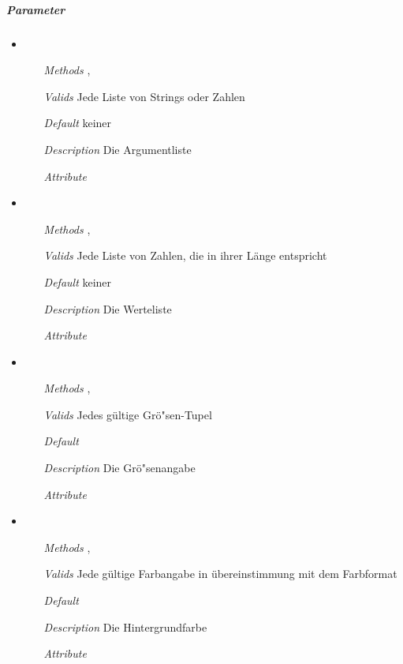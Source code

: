 \subparagraph{Parameter}
\begin{itemize}
  
\item {}
\begin{enumerate}
\item[\textit{Methods}] ,
\item[\textit{Valids}] Jede Liste von Strings oder Zahlen
\item[\textit{Default}] keiner
\item[\textit{Description}] Die Argumentliste
\item[\textit{Attribute}] 
\end{enumerate}

\item {}
\begin{enumerate}
\item[\textit{Methods}] ,
\item[\textit{Valids}] Jede Liste von Zahlen, die in ihrer L\"ange
   entspricht
\item[\textit{Default}] keiner
\item[\textit{Description}] Die Werteliste
\item[\textit{Attribute}] 
\end{enumerate}

\item {}
\begin{enumerate}
\item[\textit{Methods}] ,
\item[\textit{Valids}] Jedes g\"ultige Gr\"o"sen-Tupel
\item[\textit{Default}] 
\item[\textit{Description}] Die Gr\"o"senangabe
\item[\textit{Attribute}] 
\end{enumerate}

\item {}
\begin{enumerate}
\item[\textit{Methods}] , 
\item[\textit{Valids}] Jede g\"ultige Farbangabe in \"ubereinstimmung
  mit dem Farbformat
\item[\textit{Default}] 
\item[\textit{Description}] Die Hintergrundfarbe
\item[\textit{Attribute}] 
\end{enumerate}


\end{itemize}
